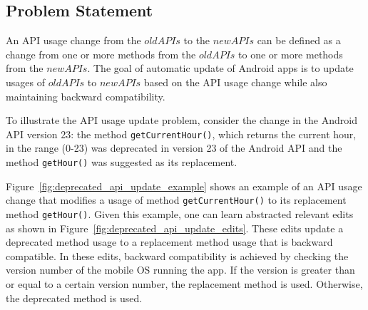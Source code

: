 
\subsection{Problem Statement}\label{sec:problem}

An API usage change from the $oldAPIs$ to the $newAPIs$ can be defined as a change from one or more methods from the $oldAPIs$ to one or more methods from the $newAPIs$. The goal of automatic update of Android apps is to update usages of $oldAPIs$ to $newAPIs$ based on the API usage change while also maintaining backward compatibility.


To illustrate the API usage update problem, consider the change in the Android API version 23: the method \texttt{getCurrentHour()}, which returns the current hour, in the range (0-23) was deprecated in version 23 of the Android API and the method \texttt{getHour()} was suggested as its replacement. 

Figure~\ref{fig:deprecated_api_update_example} shows an example of an API usage change that modifies a usage of method \texttt{getCurrentHour()} to its replacement method \texttt{getHour()}. Given this example, one can learn abstracted relevant edits as shown in Figure~\ref{fig:deprecated_api_update_edits}. These edits update a deprecated method usage to a replacement method usage that is backward compatible. In these edits, backward compatibility is achieved by checking the version number of the mobile OS running the app. If the version is greater than or equal to a certain version number, the replacement method is used. Otherwise, the deprecated method is used.

